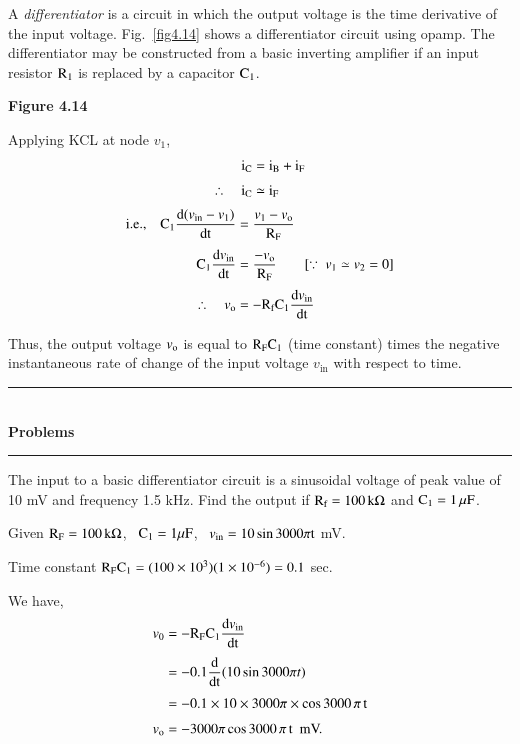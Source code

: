 A {\em differentiator} is a circuit in which the output voltage is the time derivative of the input voltage. Fig.~\ref{fig4.14} shows a differentiator circuit using opamp. The differentiator may be constructed from a basic inverting amplifier if an input resistor $\textrm{R}_{1}$ is replaced by a capacitor $\textrm{C}_{1}$.
\begin{center}
{\bf Figure 4.14}
\end{center}

Applying KCL at node $v_{1}$,
\begin{align}
\textrm{i}_{\textrm{C}} &= \textrm{i}_{\textrm{B}}+\textrm{i}_{\textrm{F}}\notag\\[3pt]
\therefore\quad \textrm{i}_{\textrm{C}} &\simeq \textrm{i}_{\textrm{F}}\label{eq4.50}
\end{align}
\begin{align}
\text{i.e.,}\quad \textrm{C}_{1}\dfrac{\textrm{d} (v_{\text{in}}-v_{1})}{\operatorname{dt}} &= \frac{v_{1}-v_{\textrm{o}}}{\textrm{R}_{\textrm{F}}}\notag\\[3pt]
\textrm{C}_{1}\dfrac{\textrm{d} v_{\text{in}}}{\operatorname{dt}} &=\frac{-v_{\textrm{o}}}{\textrm{R}_{\textrm{F}}}\qquad [\because \ v_{1}\simeq v_{2}=0]\notag\\[3pt]
\therefore\quad v_{\textrm{o}} &= -\textrm{R}_{\textrm{f}}\textrm{C}_{1}\dfrac{\textrm{d} v_{\text{in}}}{\operatorname{dt}}\label{eq4.51}
\end{align}

Thus, the output voltage $v_{\textrm{o}}$ is equal to $\textrm{R}_{\textrm{F}}\textrm{C}_{1}$ (time constant) times the negative instantaneous rate of change of the input voltage $v_{\text{in}}$ with respect to time.

\begin{center}
\rule{4cm}{1pt}\\
{\bf\Large Problems}\\[-3pt]
\rule{4cm}{1pt}
\end{center}

\begin{problem}\label{prob4.40}
The input to a basic differentiator circuit is a sinusoidal voltage of peak value of 10 mV and frequency 1.5 kHz. Find the output if $\textrm{R}_{\textrm{f}}=100\,\textrm{k}\Omega$ and $\textrm{C}_{1}=1\,\mu\textrm{F}$.
\end{problem}

\begin{solution}
Given $\textrm{R}_{\textrm{F}}=100\,\textrm{k}\Omega$, \ $\textrm{C}_{1}=1\mu\textrm{F}$,  \ $v_{\text{in}}=10\sin 3000 \pi\textrm{t}$ mV.

\medskip
Time constant $\textrm{R}_{\textrm{F}}\textrm{C}_{1}=(100\times 10^{3})(1\times 10^{-6})=0.1$ sec.

\medskip
We have,
\begin{align*}
v_{0} &= -\textrm{R}_{\textrm{F}}\textrm{C}_{1}\dfrac{\textrm{d} v_{\text{in}}}{\operatorname{dt}}\\[3pt]
&= -0.1\dfrac{\textrm{d}}{\operatorname{dt}}(10\sin 3000 \pi t)\\[3pt]
&= -0.1\times 10\times 3000 \pi \times \cos 3000\, \pi\, \textrm{t}\\[3pt]
v_{\textrm{o}} &= -3000\pi \cos 3000\, \pi\,\textrm{t} \text{~ mV.}
\end{align*}
\end{solution}


